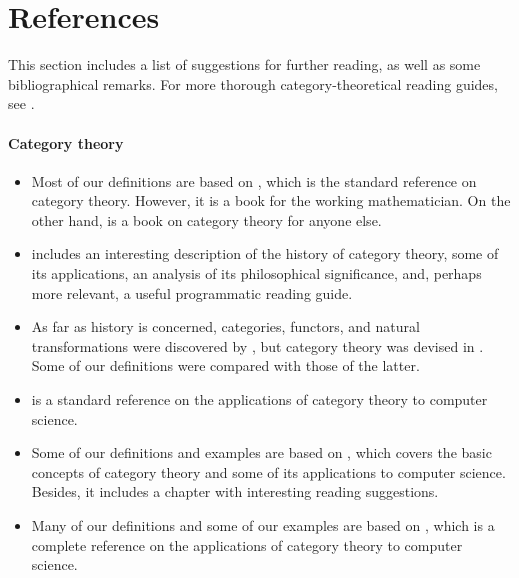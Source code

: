 \section*{References}
\label{sec:introduction-references}

This section includes a list of suggestions for further reading, as
well as some bibliographical remarks. For more thorough
category-theoretical reading guides, see
\parencites[48--56]{marquis-2013}[§ 4]{pierce-1991}.

\paragraph{Category theory}

\begin{itemize}
\item
  Most of our definitions are based on \parencite{maclane-1998}, which
  is the standard reference on category theory. However, it is a book
  for the working mathematician. On the other hand,
  \parencite{awodey-2010} is a book on category theory for anyone
  else.

\item
  \parencite{marquis-2013} includes an interesting description of the
  history of category theory, some of its applications, an analysis of
  its philosophical significance, and, perhaps more relevant, a useful
  programmatic reading guide.

\item
  As far as history is concerned, categories, functors, and natural
  transformations were discovered by
  \textcite{eilenberg-maclane-1942}, but category theory was devised
  in \parencite{eilenberg-maclane-1945}. Some of our definitions were
  compared with those of the latter.

\item
  \parencite{bird-demoor-1997} is a standard reference on the
  applications of category theory to computer science.

\item
  Some of our definitions and examples are based on
  \parencite{pierce-1991}, which covers the basic concepts of category
  theory and some of its applications to computer science. Besides, it
  includes a chapter with interesting reading suggestions.

\item
  Many of our definitions and some of our examples are based on
  \parencite{poigne-1992}, which is a complete reference on the
  applications of category theory to computer science.


\end{itemize}
